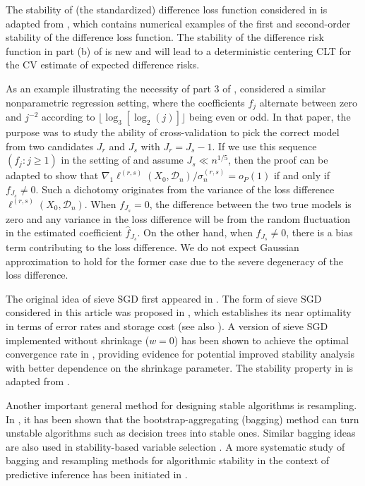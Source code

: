 \documentclass[11pt]{article}
\theoremstyle{plain}
\newcommand{\D}{{\mathcal{D}}}
\begin{document}
The stability of (the standardized) difference loss function considered in  is adapted from \cite{kissel2022high}, which contains numerical examples of the first and second-order stability of the difference loss function.  The stability of the difference risk function in part (b) of  is new and will lead to a deterministic centering CLT for the CV estimate of expected difference risks.

As an example illustrating the necessity of part 3 of ,
\cite{zhang2023targeted} considered a similar nonparametric regression setting, where the coefficients $f_j$ alternate between zero and $j^{-2}$ according to $\lfloor\log_3[\log_2(j)]\rfloor$ being even or odd. In that paper, the purpose was to study the ability of cross-validation to pick the correct model from two candidates $J_r$ and $J_s$ with $J_r=J_s-1$.  If we use this sequence $(f_j:j\ge 1)$ in the setting of  and assume $J_s\ll n^{1/5}$, then the proof can be adapted to show that  $\nabla_1\ell^{(r,s)}(X_0,\D_n)/\sigma_n^{(r,s)} =o_P(1)$ if and only if $f_{J_s}\neq 0$.
Such a dichotomy originates from the variance of the loss difference $\ell^{(r,s)}(X_0,\D_n)$. When $f_{J_s}=0$, the difference between the two true models is zero and any variance in the loss difference will be from the random fluctuation in the estimated coefficient $\hat f_{J_s}$.  On the other hand, when $f_{J_s}\neq 0$, there is a bias term contributing to the loss difference.  We do not expect Gaussian approximation to hold for the former case due to the severe degeneracy of the loss difference.

The original idea of sieve SGD first appeared in \cite{dieuleveut2016nonparametric}.
The form of sieve SGD considered in this article was proposed in \cite{zhang2022sieve}, which establishes its near optimality in terms of error rates and storage cost (see also \cite{quan2024optimal}).  
A version of sieve SGD implemented without shrinkage ($w=0$) has been shown to achieve the optimal convergence rate in \cite{chen2024stochastic}, providing evidence for potential improved stability analysis with better dependence on the shrinkage parameter.  
The stability property in  is adapted from \cite{zhang2023online}.

Another important general method for designing stable algorithms is resampling.  In \cite{buhlmann2002analyzing}, it has been shown that the bootstrap-aggregating (bagging) method can turn unstable algorithms such as decision trees into stable ones.  Similar bagging ideas are also used in stability-based variable selection \citep{meinshausen2010stability,liu2010stability}. A more systematic study of bagging and resampling methods for algorithmic stability in the context of predictive inference has been initiated in \cite{soloff2024bagging,soloff2024stability}.
\end{document}
